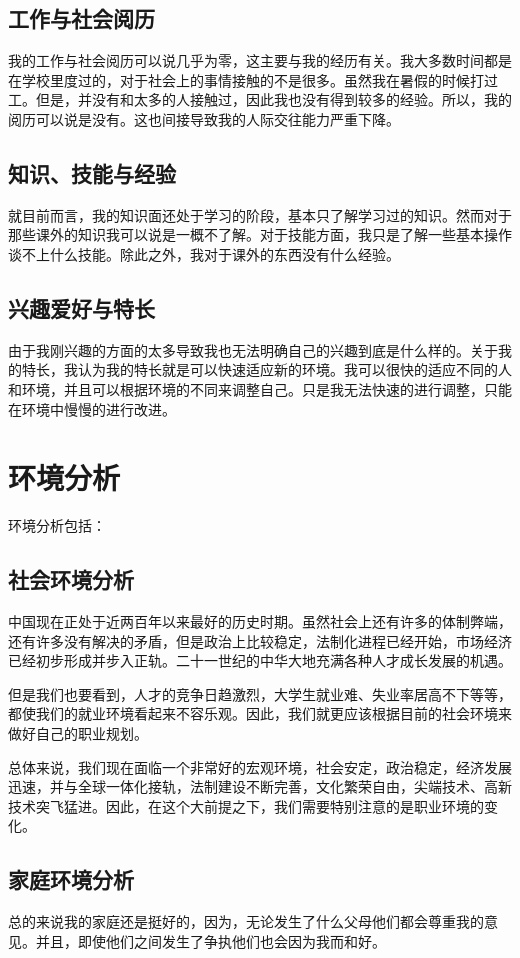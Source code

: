 \documentclass{article}
\begin{document}
\subsection{工作与社会阅历}
    我的工作与社会阅历可以说几乎为零，这主要与我的经历有关。我大多数时间都是在学校里度过的，对于社会上的事情接触的不是很多。虽然我在暑假的时候打过工。但是，并没有和太多的人接触过，因此我也没有得到较多的经验。所以，我的阅历可以说是没有。这也间接导致我的人际交往能力严重下降。\par
\subsection{知识、技能与经验}
    就目前而言，我的知识面还处于学习的阶段，基本只了解学习过的知识。然而对于那些课外的知识我可以说是一概不了解。对于技能方面，我只是了解一些基本操作谈不上什么技能。除此之外，我对于课外的东西没有什么经验。\par
\subsection{兴趣爱好与特长}
    由于我刚兴趣的方面的太多导致我也无法明确自己的兴趣到底是什么样的。关于我的特长，我认为我的特长就是可以快速适应新的环境。我可以很快的适应不同的人和环境，并且可以根据环境的不同来调整自己。只是我无法快速的进行调整，只能在环境中慢慢的进行改进。\par
\section{环境分析}
环境分析包括：\par
\subsection{社会环境分析}
     中国现在正处于近两百年以来最好的历史时期。虽然社会上还有许多的体制弊端，还有许多没有解决的矛盾，但是政治上比较稳定，法制化进程已经开始，市场经济已经初步形成并步入正轨。二十一世纪的中华大地充满各种人才成长发展的机遇。

     但是我们也要看到，人才的竞争日趋激烈，大学生就业难、失业率居高不下等等，都使我们的就业环境看起来不容乐观。因此，我们就更应该根据目前的社会环境来做好自己的职业规划。

     总体来说，我们现在面临一个非常好的宏观环境，社会安定，政治稳定，经济发展迅速，并与全球一体化接轨，法制建设不断完善，文化繁荣自由，尖端技术、高新技术突飞猛进。因此，在这个大前提之下，我们需要特别注意的是职业环境的变化。\par
\subsection{家庭环境分析}
    总的来说我的家庭还是挺好的，因为，无论发生了什么父母他们都会尊重我的意见。并且，即使他们之间发生了争执他们也会因为我而和好。    
\end{document}
